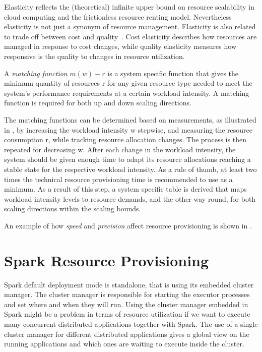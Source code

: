 Elasticity reflects the (theoretical) infinite upper bound on resource scalability in cloud computing and the frictionless resource renting model. Nevertheless elasticity is not just a synonym of resource management. Elasticity is also related to trade off between cost and quality~\cite{Dustdar2011}. Cost elasticity describes how resources are managed in response to cost changes, while quality elasticity measures how responsive is the quality to changes in resource utilization.

A \textit{matching function} $m(w) - r$ is a system specific function that gives the minimum quantity of resources r for any given resource type needed to meet the system’s performance requirements at a certain workload intensity. A matching function is required for both up and down scaling directions.

The matching functions can be determined based on measurements, as illustrated in , by increasing the workload intensity w stepwise, and measuring the resource consumption r, while tracking resource allocation changes. The process is then repeated for decreasing w. After each change in the workload intensity, the system should be given enough time to adapt its resource allocations reaching a stable state for the respective workload intensity. As a rule of thumb, at least two times the technical resource provisioning time is recommended to use as a minimum. As a result of this step, a system specific table is derived that maps workload intensity levels to resource demands, and the other way round, for both scaling directions within the scaling bounds.

An example of how \textit{speed} and \textit{precision} affect resource provisioning is shown in .


\section{Spark Resource Provisioning}\label{sec:spark_resource_provisioning}
Spark default deployment mode is standalone, that is using its embedded cluster manager. The cluster manager is responsible for starting the executor processes and set where and when they will run. Using the cluster manager embedded in Spark might be a problem in terms of resource utilization if we want to execute many concurrent distributed applications together with Spark. The use of a single cluster manager for different distributed applications gives a global view on the running applications and which ones are waiting to execute inside the cluster.

